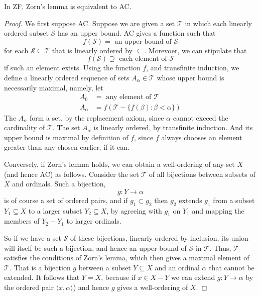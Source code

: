 \documentclass[12pt, a4paper, oneside, openright, titlepage]{book}
\begin{document}
\begin{thm}
    In ZF, Zorn's lemma is equivalent to AC.
\end{thm}
\begin{proof}
    We first suppose AC. Suppose we are given a set $\mathcal{T}$ in which each linearly ordered subset $\mathcal{S}$ has an upper bound. AC gives a function such that $$f(\mathcal{S}) = \text{ an upper bound of }\mathcal{S}$$
    for each $\mathcal{S} \subseteq \mathcal{T}$ that is linearly ordered by $\subseteq$. Morevoer, we can stipulate that $$f(\mathcal{S})\supsetneq \text{ each element of }\mathcal{S}$$
    if such an element exists. Using the function $f$, and transfinite induction, we define a linearly ordered sequence of sets $A_{\alpha} \in \mathcal{T}$ whose upper bound is necessarily maximal, namely, let \begin{align*}
        A_0 &=\text{ any element of }\mathcal{T} \\
        A_{\alpha} &= f(\mathcal{T}-\{f(\beta):\beta < \alpha\}) 
    \end{align*}
    The $A_{\alpha}$ form a set, by the replacement axiom, since $\alpha$ cannot exceed the cardinality of $\mathcal{T}$. The set $A_{\alpha}$ is linearly ordered, by transfinite induction. And its upper bound is maximal by definition of $f$, since $f$ always chooses an element greater than any chosen earlier, if it can. 


    Conversely, if Zorn's lemma holds, we can obtain a well-ordering of any set $X$ (and hence AC) as follows. Consider the set $\mathcal{T}$ of all bijections between subsets of $X$ and ordinals. Such a bijection, $$g:Y\rightarrow \alpha$$ is of course a set of ordered pairs, and if $g_1 \subset g_2$ then $g_2$ extends $g_1$ from a subset $Y_1 \subseteq X$ to a larger subset $Y_2 \subseteq X$, by agreeing with $g_1$ on $Y_1$ and mapping the members of $Y_2 - Y_1$ to larger ordinals.

    So if we have a set $\mathcal{S}$ of these bijections, linearly ordered by inclusion, its union will itself be such a bijection, and hence an upper bound of $\mathcal{S}$ in $\mathcal{T}$. Thus, $\mathcal{T}$ satisfies the conditions of Zorn's lemma, which then gives a maximal element of $\mathcal{T}$. That is a bijection $g$ between a subset $Y \subseteq X$ and an ordinal $\alpha$ that cannot be extended. It follows that $Y = X$, because if $x \in X-Y$ we can extend $g:Y\rightarrow \alpha$ by the ordered pair $\langle x,\alpha\rangle$) and hence $g$ gives a well-ordering of $X$.
\end{proof}





\begin{appendices}
	

\end{appendices}
\end{document}

